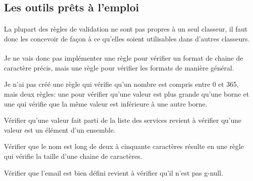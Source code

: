 \subsection{Les outils prêts à l'emploi}
\label{subsec:ready-tools}

\paragraph{}
La plupart des règles de validation ne sont pas propres à un seul classeur, il faut donc les concevoir de façon à ce qu'elles soient utilisables dans d'autres classeurs.

\paragraph{}
Je ne vais donc pas implémenter une règle pour vérifier un format de chaine de caractère précis, mais une règle pour vérifier les formats de manière général.

Je n'ai pas créé une règle qui vérifie qu'un nombre est compris entre 0 et 365, mais deux règles: une pour vérifier qu'une valeur est plus grande qu'une borne et une qui vérifie que la même valeur est inférieure à une autre borne.

Vérifier qu'une valeur fait parti de la liste des services revient à vérifier qu'une valeur est un élément d'un ensemble.

Vérifier que le nom est long de deux à cinquante caractères résulte en une règle qui vérifie la taille d'une chaine de caractères.

Vérifier que l'email est bien défini revient à vérifier qu'il n'est pas \gls{g-null}.
